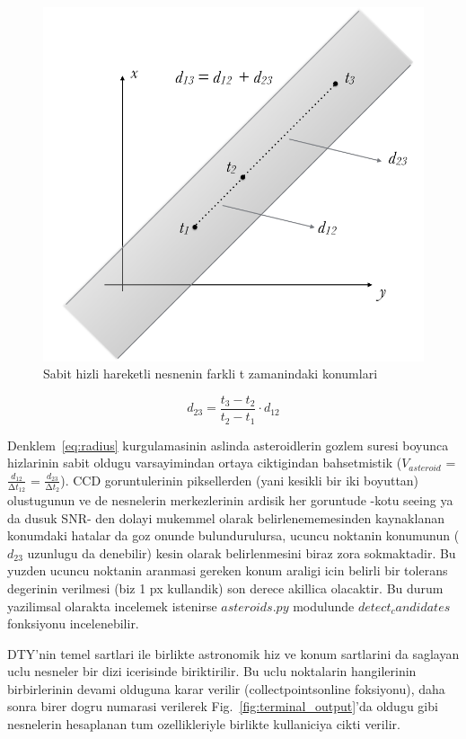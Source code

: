 \documentclass[review]{elsarticle}
\begin{document}
\begin{figure}[!t]
  \centering
  \includegraphics[scale=0.50]{hiz}
  \caption{Sabit hizli hareketli nesnenin farkli t zamanindaki konumlari}
  \label{fig:hiz}
\end{figure}

\begin{equation}
d_{23}=\frac{t_{3}-t_{2}}{t_{2}-t_{1}}\cdot d_{12}
\end{equation}

Denklem~\ref{eq:radius} kurgulamasinin aslinda asteroidlerin gozlem suresi boyunca hizlarinin sabit oldugu varsayimindan ortaya ciktigindan bahsetmistik ($V_{asteroid}$ = $\frac{d_{12}}{∆t_{12}}$ = $\frac{d_{23}}{∆t_{2}}$). CCD goruntulerinin piksellerden (yani kesikli bir iki boyuttan) olustugunun ve de nesnelerin  merkezlerinin ardisik her goruntude -kotu seeing ya da dusuk SNR- den dolayi mukemmel olarak belirlenememesinden kaynaklanan konumdaki hatalar da goz onunde bulundurulursa, ucuncu noktanin konumunun ($d_{23}$ uzunlugu da denebilir) kesin olarak belirlenmesini biraz zora sokmaktadir. Bu yuzden ucuncu noktanin aranmasi gereken konum araligi icin belirli bir tolerans degerinin verilmesi (biz 1 px kullandik) son derece akillica olacaktir. Bu durum yazilimsal olarakta incelemek istenirse $asteroids.py$ modulunde $detect_candidates$ fonksiyonu incelenebilir. 

DTY'nin temel sartlari ile birlikte astronomik hiz ve konum sartlarini da saglayan uclu nesneler bir dizi icerisinde biriktirilir. Bu uclu noktalarin hangilerinin birbirlerinin devami olduguna karar verilir (collectpointsonline foksiyonu), daha sonra birer dogru numarasi verilerek Fig.~\ref{fig:terminal_output}'da oldugu gibi nesnelerin hesaplanan tum ozellikleriyle birlikte kullaniciya cikti verilir.
\end{document}
